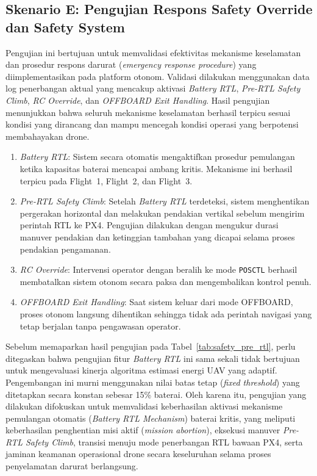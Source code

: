 \subsection{Skenario E: Pengujian Respons Safety Override dan Safety System}

Pengujian ini bertujuan untuk memvalidasi efektivitas mekanisme keselamatan dan prosedur respons darurat (\textit{emergency response procedure}) yang diimplementasikan pada platform otonom. Validasi dilakukan menggunakan data log penerbangan aktual yang mencakup aktivasi \textit{Battery RTL}, \textit{Pre-RTL Safety Climb}, \textit{RC Override}, dan \textit{OFFBOARD Exit Handling}. Hasil pengujian menunjukkan bahwa seluruh mekanisme keselamatan berhasil terpicu sesuai kondisi yang dirancang dan mampu mencegah kondisi operasi yang berpotensi membahayakan drone.

\begin{enumerate}
	\item \textit{Battery RTL}: Sistem secara otomatis mengaktifkan prosedur pemulangan ketika kapasitas baterai mencapai ambang kritis. Mekanisme ini berhasil terpicu pada Flight~1, Flight~2, dan Flight~3.
	
	\item \textit{Pre-RTL Safety Climb}: Setelah \textit{Battery RTL} terdeteksi, sistem menghentikan pergerakan horizontal dan melakukan pendakian vertikal sebelum mengirim perintah RTL ke PX4. Pengujian dilakukan dengan mengukur durasi manuver pendakian dan ketinggian tambahan yang dicapai selama proses pendakian pengamanan.
	
	\item \textit{RC Override}: Intervensi operator dengan beralih ke mode \texttt{POSCTL} berhasil membatalkan sistem otonom secara paksa dan mengembalikan kontrol penuh.
	
	\item \textit{OFFBOARD Exit Handling}: Saat sistem keluar dari mode OFFBOARD, proses otonom langsung dihentikan sehingga tidak ada perintah navigasi yang tetap berjalan tanpa pengawasan operator.
\end{enumerate}

Sebelum memaparkan hasil pengujian pada Tabel~\ref{tab:safety_pre_rtl}, perlu ditegaskan bahwa pengujian fitur \textit{Battery RTL} ini sama sekali tidak bertujuan untuk mengevaluasi kinerja algoritma estimasi energi UAV yang adaptif. Pengembangan ini murni menggunakan nilai batas tetap (\textit{fixed threshold}) yang ditetapkan secara konstan sebesar 15\% baterai. Oleh karena itu, pengujian yang dilakukan difokuskan untuk memvalidasi keberhasilan aktivasi mekanisme pemulangan otomatis (\textit{Battery RTL Mechanism}) baterai kritis, yang meliputi keberhasilan penghentian misi aktif (\textit{mission abortion}), eksekusi manuver \textit{Pre-RTL Safety Climb}, transisi menuju mode penerbangan RTL bawaan PX4, serta jaminan keamanan operasional drone secara keseluruhan selama proses penyelamatan darurat berlangsung.

